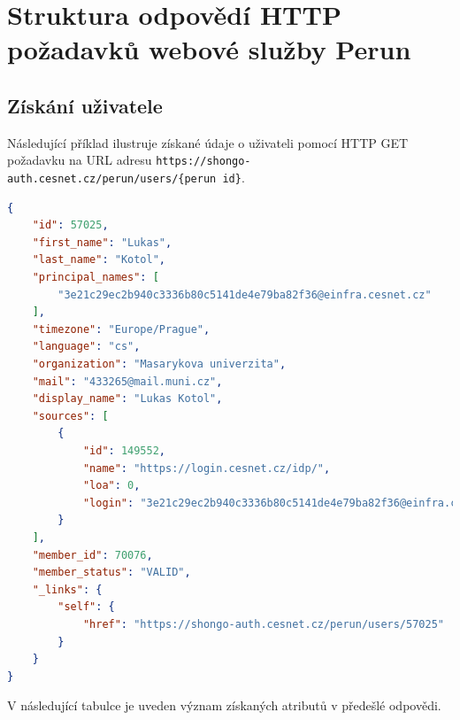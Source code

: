 \documentclass[
  printed, %
  twoside, %
  table,   %
  nolof,     %
  nolot,     %
]{fithesis3}
\begin{document}
\printbibliography[title={Literatura}]

\appendix %


\chapter{Struktura odpovědí HTTP požadavků webové služby Perun}

\section{Získání uživatele}
\label{table:perunws:user}
Následující příklad ilustruje získané údaje o uživateli pomocí HTTP GET požadavku na URL adresu \texttt{https://shongo-auth.cesnet.cz/perun/users/\{perun id\}}.

\begin{lstlisting}[language=json,firstnumber=1]
{
    "id": 57025,
    "first_name": "Lukas",
    "last_name": "Kotol",
    "principal_names": [
        "3e21c29ec2b940c3336b80c5141de4e79ba82f36@einfra.cesnet.cz"
    ],
    "timezone": "Europe/Prague",
    "language": "cs",
    "organization": "Masarykova univerzita",
    "mail": "433265@mail.muni.cz",
    "display_name": "Lukas Kotol",
    "sources": [
        {
            "id": 149552,
            "name": "https://login.cesnet.cz/idp/",
            "loa": 0,
            "login": "3e21c29ec2b940c3336b80c5141de4e79ba82f36@einfra.cesnet.cz"
        }
    ],
    "member_id": 70076,
    "member_status": "VALID",
    "_links": {
        "self": {
            "href": "https://shongo-auth.cesnet.cz/perun/users/57025"
        }
    }
}
\end{lstlisting}
V následující tabulce je uveden význam získaných atributů v předešlé odpovědi.
\end{document}
